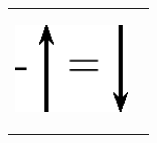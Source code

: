     \setlength\myfixedwidth{0pt}
    \setlength\mystarwidth{\mytableroom}
        \addtolength\mystarwidth{-\myfixedwidth}
        \divide{}
        
    
            
    
        \begin{center}
      
      \label{m38813*id188904}
      
    \noindent
      \tablelasttail{}
      \begin{xtabular*}{\mytablewidth}[t]{|p{10\mystarwidth}|p{10\mystarwidth}|}\hline
    
    
        
                  
    \setcounter{subfigure}{0}

\label{m38813*id188912}
    \begin{center}
    \label{m38813*id188912!!!underscore!!!media}\label{m38813*id188912!!!underscore!!!printimage}\includegraphics[width=3cm]{col11305.imgs/m38813_PG11C1_033.png} %
        
      \vspace{2pt}
    \vspace{.1in}
    
    \end{center}



    \addtocounter{footnote}{-0}
    
                 &
    
    
        

\end{xtabular*}
\end{center}
